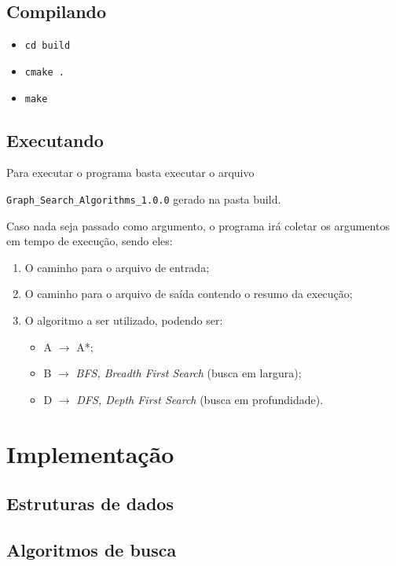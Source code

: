 \documentclass[12pt, a4paper]{article}
\begin{document}
\subsection{Compilando}\label{sec:compilando}
\begin{itemize}
    \item\texttt{cd build}
    \item\texttt{cmake .}
    \item\texttt{make}
\end{itemize}

\subsection{Executando}\label{sec:executando}
Para executar o programa basta executar o arquivo

\texttt{Graph\_Search\_Algorithms\_1.0.0} gerado na pasta build.

Caso nada seja passado como argumento, o programa irá coletar os argumentos em tempo de execução,
sendo eles:
\begin{enumerate}
    \item O caminho para o arquivo de entrada;
    \item O caminho para o arquivo de saída contendo o resumo da execução;
    \item O algoritmo a ser utilizado, podendo ser:
    \begin{itemize}
        \item A \( \rightarrow \) A*;
        \item B \( \rightarrow \) \textit{BFS, Breadth First Search} (busca em largura);
        \item D \( \rightarrow \) \textit{DFS, Depth First Search} (busca em profundidade).
    \end{itemize}
\end{enumerate}

\section{Implementação}\label{sec:impl}

\subsection{Estruturas de dados}\label{sec:estruturas}

\subsection{Algoritmos de busca}\label{sec:algoritmos}
\end{document}
